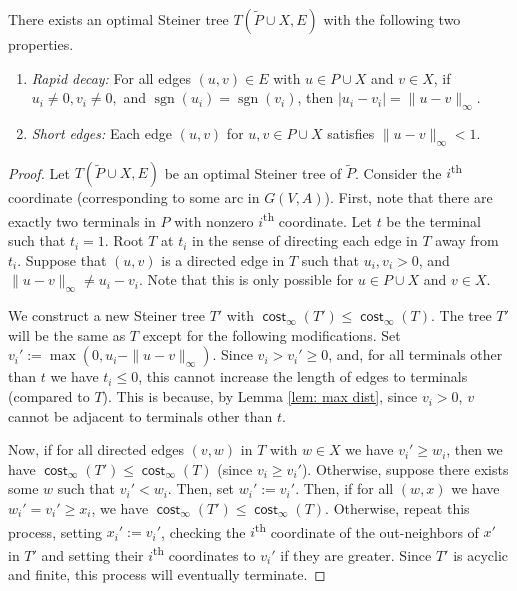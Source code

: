 \documentclass{theoretics}
\DeclareMathOperator{\cost}{\mathsf{cost}}
\DeclareMathOperator{\sgn}{sgn}
\newcommand{\1}{\textbf{1}}
\renewcommand{\tilde}{\widetilde}
\begin{document}
\begin{lemma} \label{lem: structural props}
There exists an optimal Steiner tree $T(\tilde{P} \cup X, E)$ with the following two properties. 
\begin{enumerate}[label=(P\arabic*)]
\item \textit{Rapid decay:} For all edges $(u,v) \in E$ with $u \in P \cup X$ and $v \in X$, if $u_i\neq 0, v_i \neq 0,$ and $\sgn(u_i) = \sgn(v_i)$, then $|u_i - v_i| = \|u - v\|_{\infty}$. \label{cond: max decrease}
\item \textit{Short edges:} Each edge $(u, v)$ for $u,v \in P \cup X$ satisfies $\|u - v\|_{\infty} < 1.$ \label{cond: short edges}
\end{enumerate}
\end{lemma}
\begin{proof}
Let $T(\tilde{P} \cup X, E)$ be an optimal Steiner tree of $\tilde{P}$. Consider the $i$\textsuperscript{th} coordinate (corresponding to some arc in $G(V,A)$). First, note that there are exactly two terminals in $P$ with nonzero $i$\textsuperscript{th} coordinate. Let $t$ be the terminal such that $t_i = 1$. Root $T$ at $t_i$ in the sense of directing each edge in $T$ away from $t_i$. Suppose that $(u,v)$ is a directed edge in $T$ such that $u_i, v_i > 0$, and $\|u - v\|_{\infty} \neq u_i - v_i$. Note that this is only possible for $u \in P \cup X$ and $v \in X$.

We construct a new Steiner tree $T'$ with $\cost_{\infty}(T') \leq \cost_{\infty}(T)$. The tree $T'$ will be the same as $T$ except for the following modifications. Set $v_i'  := \max(0, u_i - \|u - v\|_{\infty})$. Since $v_i > v_i' \geq 0$, and, for all terminals other than $t$ we have $t_i \leq 0$, this cannot increase the length of edges to terminals (compared to $T$). This is because, by Lemma \ref{lem: max dist}, since $v_i > 0$, $v$ cannot be adjacent to terminals other than $t$.
 
 Now, if for all directed edges $(v, w)$ in $T$ with $w \in X$ we have $v_i' \geq w_i$, then we have $\cost_{\infty}(T') \leq \cost_{\infty}(T)$ (since $v_i \geq v_i'$). Otherwise, suppose there exists some $w$ such that $v_i' < w_i$. Then, set $w_i'  := v_i'$. Then, if for all $(w,x)$ we have $w_i' = v_i' \geq x_i$, we have $\cost_{\infty}(T') \leq \cost_{\infty}(T)$. Otherwise, repeat this process, setting $x_i' := v_i'$, checking the $i$\textsuperscript{th} coordinate of the out-neighbors of $x'$ in $T'$ and setting their $i$\textsuperscript{th} coordinates to $v_i'$ if they are greater. Since  $T'$ is acyclic and finite, this process will eventually terminate. 
 

\end{proof}
\end{document}
